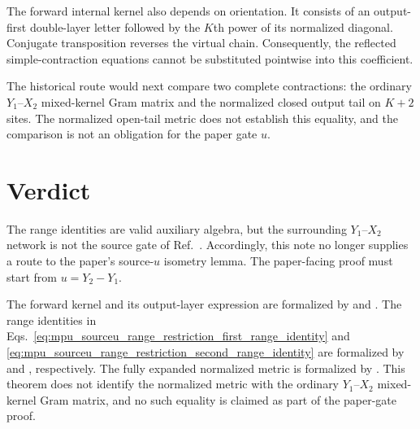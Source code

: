 \documentclass{article}
\begin{document}
The forward internal kernel also depends on orientation. It consists of an
output-first double-layer letter followed by the $K$th power of its normalized
diagonal. Conjugate transposition reverses the virtual chain. Consequently, the
reflected simple-contraction equations cannot be substituted pointwise into
this coefficient.

The historical route would next compare two complete contractions: the
ordinary $Y_1$--$X_2$ mixed-kernel Gram matrix and the normalized closed output
tail on $K+2$ sites. The normalized open-tail metric does not establish this
equality, and the comparison is not an obligation for the paper gate $u$.

\section{Verdict}

The range identities are valid auxiliary algebra, but the surrounding
$Y_1$--$X_2$ network is not the source gate of Ref.~\cite{Cirac2017MPU}.
Accordingly, this note no longer supplies a route to the paper's source-$u$
isometry lemma. The paper-facing proof must start from $u=Y_2\mathbin{-}Y_1$.

The forward kernel and its output-layer expression are formalized by
 and
.
The range identities in
Eqs.~\ref{eq:mpu_sourceu_range_restriction_first_range_identity} and
\ref{eq:mpu_sourceu_range_restriction_second_range_identity} are formalized by
 and
, respectively.
The fully expanded normalized metric is formalized by
. This theorem does
not identify the normalized metric with the ordinary $Y_1$--$X_2$ mixed-kernel
Gram matrix, and no such equality is claimed as part of the paper-gate proof.



\end{document}
